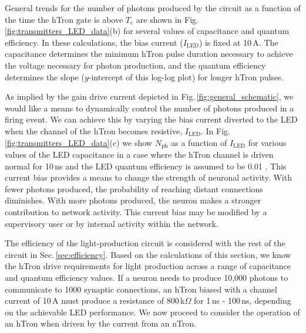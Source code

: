 \documentclass[twocolumn]{article}
\begin{document}
General trends for the number of photons produced by the circuit as a function of the time the hTron gate is above $T_{\mathrm{c}}$ are shown in Fig.\,\ref{fig:transmitters_LED_data}(b) for several values of capacitance and quantum efficiency. In these calculations, the bias current ($I_{\mathrm{LED}}$) is fixed at 10\,\textmu A. The capacitance determines the minimum hTron pulse duration necessary to achieve the voltage necessary for photon production, and the quantum efficiency determines the slope ($y$-intercept of this log-log plot) for longer hTron pulses.

As implied by the gain drive current depicted in Fig.\,\ref{fig:general_schematic}, we would like a means to dynamically control the number of photons produced in a firing event. We can achieve this by varying the bias current diverted to the LED when the channel of the hTron becomes resistive, $I_{\mathrm{LED}}$. In Fig.\,\ref{fig:transmitters_LED_data}(c) we show $N_{\mathrm{ph}}$ as a function of $I_{\mathrm{LED}}$ for various values of the LED capacitance in a case where the hTron channel is driven normal for 10\,ns and the LED quantum efficiency is assumed to be 0.01 \cite{doro2017}. This current bias provides a means to change the strength of neuronal activity. With fewer photons produced, the probability of reaching distant connections diminishes. With more photons produced, the neuron makes a stronger contribution to network activity. This current bias may be modified by a supervisory user or by internal activity within the network.

The efficiency of the light-production circuit is considered with the rest of the circuit in Sec.\,\ref{sec:efficiency}. Based on the calculations of this section, we know the hTron drive requirements for light production across a range of capacitance and quantum efficiency values. If a neuron needs to produce 10,000 photons to communicate to 1000 synaptic connections, an hTron biased with a channel current of 10\,\textmu A must produce a resistance of 800\,k$\Omega$ for 1\,ns - 100\,ns, depending on the achievable LED performance. We now proceed to consider the operation of an hTron when driven by the current from an nTron.  
	
\end{document}
